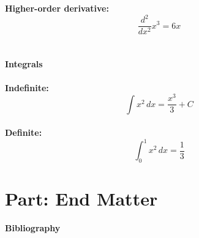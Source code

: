 \documentclass[
12pt, %
a4paper, %
fleqn,   %
]{notes}
\begin{document}
\noindent
\textbf{Higher-order derivative:}
\[
\frac{d^2}{dx^2} x^3 = 6x
\] \\


\subsection{Integrals}
\textbf{Indefinite:}
\[
\int x^2 \, dx = \frac{x^3}{3} + C
\] \\

\noindent
\textbf{Definite:}
\[
\int_{0}^{1} x^2 \, dx = \frac{1}{3}
\]


\part{Part: End Matter}

\stopcontents[part]


\cleardoublepage
{}
\printindex %

% 



{\sffamily\normalsize\bfseries Bibliography}


\chapterspaceabove{6.75cm}
\chapterspacebelow{7.25cm}
\end{document}
